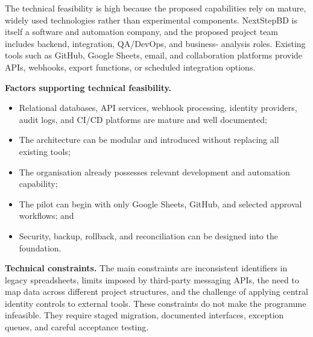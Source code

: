 \documentclass[12pt,a4paper]{report}
\begin{document}
The technical feasibility is high because the proposed capabilities rely on mature, widely used
technologies rather than experimental components. NextStepBD is itself a software and automation
company, and the proposed project team includes backend, integration, QA/DevOps, and business-
analysis roles. Existing tools such as GitHub, Google Sheets, email, and collaboration platforms
provide APIs, webhooks, export functions, or scheduled integration options.

\textbf{Factors supporting technical feasibility.}
\begin{itemize}[leftmargin=1.6em]
    \item Relational databases, API services, webhook processing, identity providers, audit logs,
          and CI/CD platforms are mature and well documented;
    \item The architecture can be modular and introduced without replacing all existing tools;
    \item The organisation already possesses relevant development and automation capability;
    \item The pilot can begin with only Google Sheets, GitHub, and selected approval workflows;
          and
    \item Security, backup, rollback, and reconciliation can be designed into the foundation.
\end{itemize}

\textbf{Technical constraints.}
The main constraints are inconsistent identifiers in legacy spreadsheets, limits imposed by
third-party messaging APIs, the need to map data across different project structures, and the
challenge of applying central identity controls to external tools. These constraints do not make
the programme infeasible. They require staged migration, documented interfaces, exception
queues, and careful acceptance testing.
\end{document}
